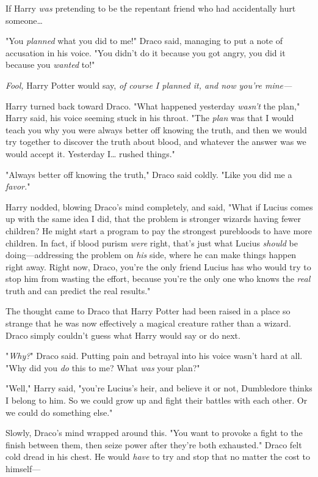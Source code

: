 If Harry \emph{was} pretending to be the repentant friend who had accidentally 
hurt someone{\ldots}

"You \emph{planned} what you did to me!" Draco said, managing to put a note of 
accusation in his voice. "You didn't do it because you got angry, you did it 
because you \emph{wanted} to!"

\emph{Fool,} Harry Potter would say, \emph{of course I planned it, and now 
you're mine---}

Harry turned back toward Draco. "What happened yesterday \emph{wasn't} the 
plan," Harry said, his voice seeming stuck in his throat. "The \emph{plan} was 
that I would teach you why you were always better off knowing the truth, and 
then we would try together to discover the truth about blood, and whatever the 
answer was we would accept it. Yesterday I{\ldots} rushed things."

"Always better off knowing the truth," Draco said coldly. "Like you did me a 
\emph{favor.}"

Harry nodded, blowing Draco's mind completely, and said, "What if Lucius comes 
up with the same idea I did, that the problem is stronger wizards having fewer 
children? He might start a program to pay the strongest purebloods to have more 
children. In fact, if blood purism \emph{were} right, that's just what Lucius 
\emph{should} be doing---addressing the problem on \emph{his} side, where he 
can make things happen right away. Right now, Draco, you're the only friend 
Lucius has who would try to stop him from wasting the effort, because you're 
the only one who knows the \emph{real} truth and can predict the real results."

The thought came to Draco that Harry Potter had been raised in a place so 
strange that he was now effectively a magical creature rather than a wizard. 
Draco simply couldn't guess what Harry would say or do next.

"\emph{Why?}" Draco said. Putting pain and betrayal into his voice wasn't hard 
at all. "Why did you \emph{do} this to me? What \emph{was} your plan?"

"Well," Harry said, "you're Lucius's heir, and believe it or not, Dumbledore 
thinks I belong to him. So we could grow up and fight their battles with each 
other. Or we could do something else."

Slowly, Draco's mind wrapped around this. "You want to provoke a fight to the 
finish between them, then seize power after they're both exhausted." Draco felt 
cold dread in his chest. He would \emph{have} to try and stop that no matter 
the cost to himself---


